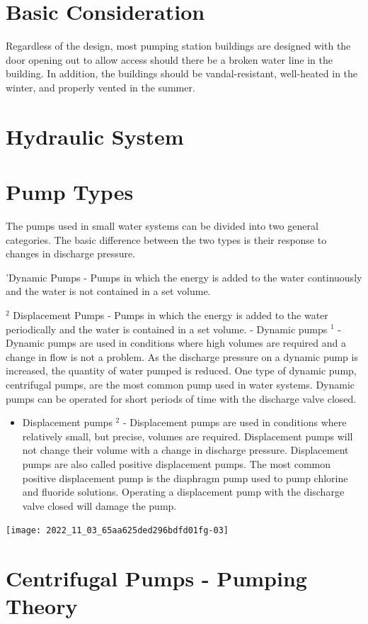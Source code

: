 \documentclass[10pt]{article}
\begin{document}
\section{Basic Consideration}
Regardless of the design, most pumping station buildings are designed with the door opening out to allow access should there be a broken water line in the building. In addition, the buildings should be vandal-resistant, well-heated in the winter, and properly vented in the summer.

\section{Hydraulic System}
\section{Pump Types}
The pumps used in small water systems can be divided into two general categories. The basic difference between the two types is their response to changes in discharge pressure.

'Dynamic Pumps - Pumps in which the energy is added to the water continuously and the water is not contained in a set volume.

${ }^{2}$ Displacement Pumps - Pumps in which the energy is added to the water periodically and the water is contained in a set volume. - Dynamic pumps ${ }^{1}$ - Dynamic pumps are used in conditions where high volumes are required and a change in flow is not a problem. As the discharge pressure on a dynamic pump is increased, the quantity of water pumped is reduced. One type of dynamic pump, centrifugal pumps, are the most common pump used in water systems. Dynamic pumps can be operated for short periods of time with the discharge valve closed.

\begin{itemize}
  \item Displacement pumps ${ }^{2}$ - Displacement pumps are used in conditions where relatively small, but precise, volumes are required. Displacement pumps will not change their volume with a change in discharge pressure. Displacement pumps are also called positive displacement pumps. The most common positive displacement pump is the diaphragm pump used to pump chlorine and fluoride solutions. Operating a displacement pump with the discharge valve closed will damage the pump.
\end{itemize}
\texttt{[image: 2022\_11\_03\_65aa625ded296bdfd01fg-03]}

\section{Centrifugal Pumps - Pumping Theory}
\end{document}
